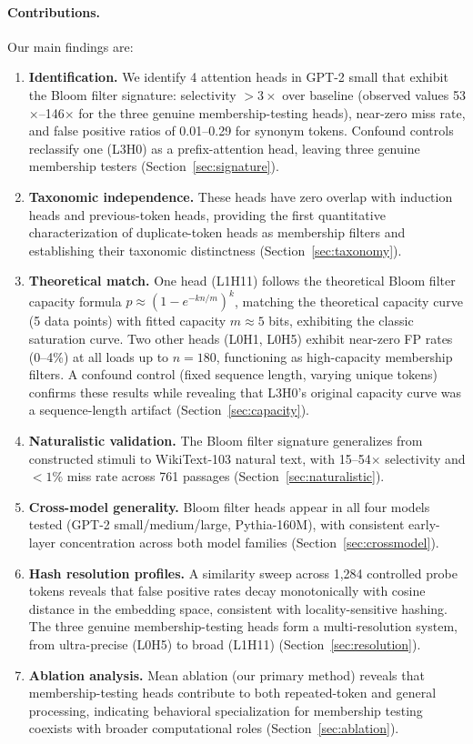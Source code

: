 \documentclass[11pt]{article}
\begin{document}
\paragraph{Contributions.} Our main findings are:
\begin{enumerate}
    \item \textbf{Identification.} We identify 4 attention heads in GPT-2 small that exhibit the Bloom filter signature: selectivity $>3\times$ over baseline (observed values 53$\times$--146$\times$ for the three genuine membership-testing heads), near-zero miss rate, and false positive ratios of 0.01--0.29 for synonym tokens. Confound controls reclassify one (L3H0) as a prefix-attention head, leaving three genuine membership testers (Section~\ref{sec:signature}).
    \item \textbf{Taxonomic independence.} These heads have zero overlap with induction heads and previous-token heads, providing the first quantitative characterization of duplicate-token heads \citep{wang2022interpretability} as membership filters and establishing their taxonomic distinctness (Section~\ref{sec:taxonomy}).
    \item \textbf{Theoretical match.} One head (L1H11) follows the theoretical Bloom filter capacity formula $p \approx (1 - e^{-kn/m})^k$, matching the theoretical capacity curve (5 data points) with fitted capacity $m \approx 5$ bits, exhibiting the classic saturation curve. Two other heads (L0H1, L0H5) exhibit near-zero FP rates (0--4\%) at all loads up to $n = 180$, functioning as high-capacity membership filters. A confound control (fixed sequence length, varying unique tokens) confirms these results while revealing that L3H0's original capacity curve was a sequence-length artifact (Section~\ref{sec:capacity}).
    \item \textbf{Naturalistic validation.} The Bloom filter signature generalizes from constructed stimuli to WikiText-103 natural text, with 15--54$\times$ selectivity and $<1\%$ miss rate across 761 passages (Section~\ref{sec:naturalistic}).
    \item \textbf{Cross-model generality.} Bloom filter heads appear in all four models tested (GPT-2 small/medium/large, Pythia-160M), with consistent early-layer concentration across both model families (Section~\ref{sec:crossmodel}).
    \item \textbf{Hash resolution profiles.} A similarity sweep across 1,284 controlled probe tokens reveals that false positive rates decay monotonically with cosine distance in the embedding space, consistent with locality-sensitive hashing. The three genuine membership-testing heads form a multi-resolution system, from ultra-precise (L0H5) to broad (L1H11) (Section~\ref{sec:resolution}).
    \item \textbf{Ablation analysis.} Mean ablation (our primary method) reveals that membership-testing heads contribute to both repeated-token and general processing, indicating behavioral specialization for membership testing coexists with broader computational roles (Section~\ref{sec:ablation}).
\end{enumerate}
\end{document}
